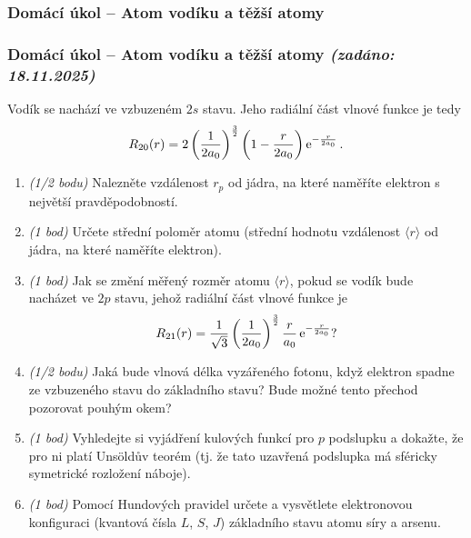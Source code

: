 \documentclass[a4paper,11pt,twoside]{article}
\newenvironment{homework}{}{}
\newcommand{\np}{\clearpage\newpage}
\newcommand{\exercise}[2][]{\ifthenelse{\isempty{#1}}
	{\np\thispagestyle{empty}\subsubsection*{Domácí úkol -- #2}}
	{\np\thispagestyle{empty}\np\subsubsection*{Domácí úkol -- #2 \small{\it{(zadáno: {#1})}}}}
}
\begin{document}
\begin{homework}
	\exercise[18.11.2025]{Atom vodíku a těžší atomy}
		Vodík se nachází ve vzbuzeném $2s$ stavu.
		Jeho radiální část vlnové funkce je tedy
		\begin{equation*}
			R_{20}(r)=2\left(\frac{1}{2a_{0}}\right)^{\frac{3}{2}}\left(1-\frac{r}{2a_{0}}\right)\operatorname{e}^{-\frac{r}{2a_0}}.
		\end{equation*}

		\begin{enumerate}
			\item\emph{(1/2 bodu)}
				Nalezněte vzdálenost $r_{p}$ od jádra, na které naměříte elektron s největší pravděpodobností.

			\item\emph{(1 bod)}
				Určete střední poloměr atomu (střední hodnotu vzdálenost $\langle r\rangle$ od jádra, na které naměříte elektron).

			\item\emph{(1 bod)}
				Jak se změní měřený rozměr atomu $\langle r\rangle$, pokud se vodík bude nacházet ve $2p$ stavu, jehož radiální část vlnové funkce je
				\begin{equation*}
					R_{21}(r)=\frac{1}{\sqrt{3}}\left(\frac{1}{2a_{0}}\right)^{\frac{3}{2}}\frac{r}{a_{0}}\operatorname{e}^{-\frac{r}{2a_{0}}}?
				\end{equation*}

			\item\emph{(1/2 bodu)}
				Jaká bude vlnová délka vyzářeného fotonu, když elektron spadne ze vzbuzeného stavu do základního stavu?
				Bude možné tento přechod pozorovat pouhým okem?

			\item\emph{(1 bod)}
				Vyhledejte si vyjádření kulových funkcí pro $p$ podslupku a dokažte, že pro ni platí Unsöldův teorém (tj. že tato uzavřená podslupka má sféricky symetrické rozložení náboje).

			\item\emph{(1 bod)}
				Pomocí Hundových pravidel určete a vysvětlete elektronovou konfiguraci (kvantová čísla $L$, $S$, $J$) základního stavu atomu síry a arsenu.
		\end{enumerate}

		\newpage
\end{homework}
\end{document}
